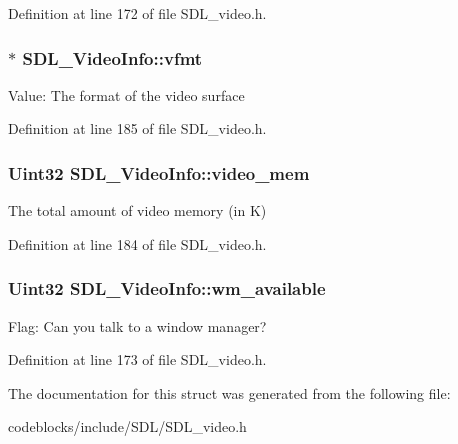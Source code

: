 Definition at line 172 of file S\+D\+L\+\_\+video.\+h.

\hypertarget{structSDL__VideoInfo_a8501500d288bda9c60d8251138478f08}{
\subsubsection[{vfmt}]{$\ast$ S\+D\+L\+\_\+\+Video\+Info\+::vfmt}}\label{structSDL__VideoInfo_a8501500d288bda9c60d8251138478f08}
Value\+: The format of the video surface 

Definition at line 185 of file S\+D\+L\+\_\+video.\+h.

\hypertarget{structSDL__VideoInfo_ab706d6c856b170f8da28786e98fb5de3}{
\subsubsection[{video\+\_\+mem}]{\setlength{\rightskip}{0pt plus 5cm}Uint32 S\+D\+L\+\_\+\+Video\+Info\+::video\+\_\+mem}}\label{structSDL__VideoInfo_ab706d6c856b170f8da28786e98fb5de3}
The total amount of video memory (in K) 

Definition at line 184 of file S\+D\+L\+\_\+video.\+h.

\hypertarget{structSDL__VideoInfo_aa7dee6b91b73acd0476d67d7036669e9}{
\subsubsection[{wm\+\_\+available}]{\setlength{\rightskip}{0pt plus 5cm}Uint32 S\+D\+L\+\_\+\+Video\+Info\+::wm\+\_\+available}}\label{structSDL__VideoInfo_aa7dee6b91b73acd0476d67d7036669e9}
Flag\+: Can you talk to a window manager? 

Definition at line 173 of file S\+D\+L\+\_\+video.\+h.



The documentation for this struct was generated from the following file\+:\begin{DoxyCompactItemize}
\item 
codeblocks/include/\+S\+D\+L/S\+D\+L\+\_\+video.\+h\end{DoxyCompactItemize}

